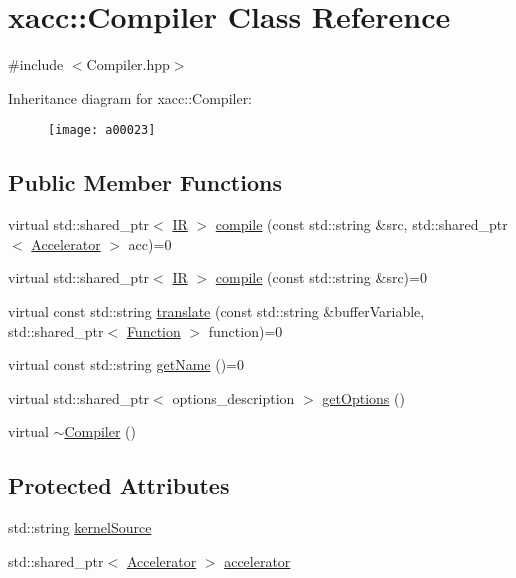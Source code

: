 \hypertarget{a00023}{}\section{xacc\+:\+:Compiler Class Reference}
\label{a00023}


{\ttfamily \#include $<$Compiler.\+hpp$>$}

Inheritance diagram for xacc\+:\+:Compiler\+:\begin{figure}[H]
\begin{center}
\leavevmode
\texttt{[image: a00023]}
\end{center}
\end{figure}
\subsection*{Public Member Functions}
\begin{DoxyCompactItemize}
\item 
virtual std\+::shared\+\_\+ptr$<$ \hyperlink{a00051}{IR} $>$ \hyperlink{a00023_a546a40c95bb93af6a0c0ac48dbeaffc8}{compile} (const std\+::string \&src, std\+::shared\+\_\+ptr$<$ \hyperlink{a00011}{Accelerator} $>$ acc)=0
\item 
virtual std\+::shared\+\_\+ptr$<$ \hyperlink{a00051}{IR} $>$ \hyperlink{a00023_a9092f5f779b570c91569b59621280c04}{compile} (const std\+::string \&src)=0
\item 
virtual const std\+::string \hyperlink{a00023_aeedbe58a33fed29e4d7694ae743e25e7}{translate} (const std\+::string \&buffer\+Variable, std\+::shared\+\_\+ptr$<$ \hyperlink{a00039}{Function} $>$ function)=0
\item 
virtual const std\+::string \hyperlink{a00023_a87fca9100e6462122f5b687c3a0fb3fb}{get\+Name} ()=0
\item 
virtual std\+::shared\+\_\+ptr$<$ options\+\_\+description $>$ \hyperlink{a00023_a9f5a8965c9c2dd895016d18264ebbe92}{get\+Options} ()
\item 
virtual \hyperlink{a00023_a5d0b012687d9b44893872eaa81e47b38}{$\sim$\+Compiler} ()
\end{DoxyCompactItemize}
\subsection*{Protected Attributes}
\begin{DoxyCompactItemize}
\item 
std\+::string \hyperlink{a00023_a0ad81c816c09e5113d03cdc02165c453}{kernel\+Source}
\item 
std\+::shared\+\_\+ptr$<$ \hyperlink{a00011}{Accelerator} $>$ \hyperlink{a00023_ad4cbb467fa7e377bac6c054ffcb22b7c}{accelerator}
\end{DoxyCompactItemize}


